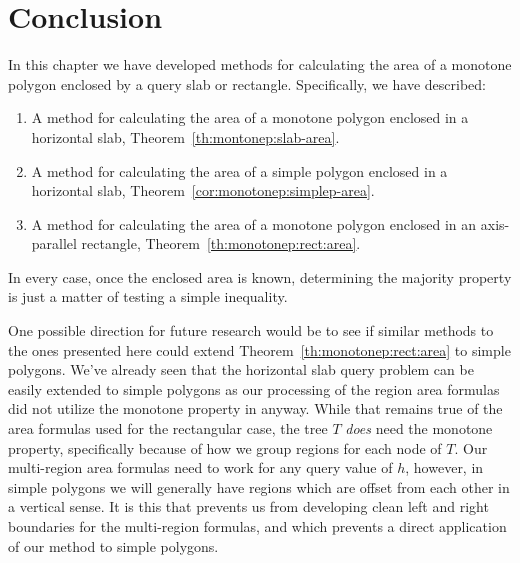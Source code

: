\section{Conclusion}
\label{:monotonep:concl}

In this chapter we have developed methods for calculating the area of a monotone polygon enclosed by a query slab or rectangle.  Specifically, we have described:

\begin{enumerate}
\item A method for calculating the area of a monotone polygon enclosed in a horizontal slab, Theorem~\ref{th:montonep:slab-area}.

\item A method for calculating the area of a simple polygon enclosed in a horizontal slab, Theorem~\ref{cor:monotonep:simplep-area}.

\item A method for calculating the area of a monotone polygon enclosed in an axis-parallel rectangle, Theorem~\ref{th:monotonep:rect:area}.

\end{enumerate}

In every case, once the enclosed area is known, determining the majority property is just a matter of testing a simple inequality.

One possible direction for future research would be to see if similar methods to the ones presented here could extend Theorem~\ref{th:monotonep:rect:area} to simple polygons. We've already seen that the horizontal slab query problem can be easily extended to simple polygons as our processing of the region area formulas did not utilize the monotone property in anyway. While that remains true of the area formulas used for the rectangular case, the tree $T$ \emph{does} need the monotone property, specifically because of how we group regions for each node of $T$. Our multi-region area formulas need to work for any query value of $h$, however, in simple polygons we will generally have regions which are offset from each other in a vertical sense. It is this that prevents us from developing clean left and right boundaries for the multi-region formulas, and which prevents a direct application of our method to simple polygons.

